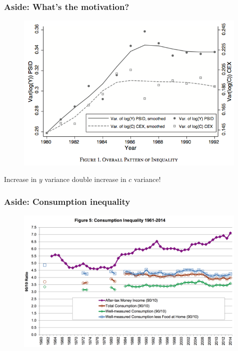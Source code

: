 \documentclass{beamer}
\begin{document}
\begin{frame}
\frametitle[alignment=center]{Aside:  What's the motivation?}
\begin{figure}
\includegraphics[scale=0.5]{BPP.png}
\end{figure}
Increase in $y$ variance double increase in $c$ variance!
\end{frame}

\begin{frame}
\frametitle[alignment=center]{Aside:  Consumption inequality}
\begin{figure}
\includegraphics[scale=0.18]{MeyerSullivan2017.png}
\end{figure}
\end{frame}
\end{document}
